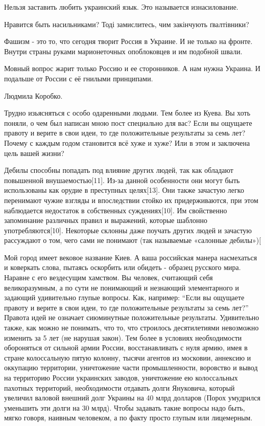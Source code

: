 \begin{itemize}
\begin{itemize}
Нельзя заставить любить украинский язык. Это называется изнасилование.

Нравится быть насильниками? Тоді замислитесь, чим закінчують ґвалтівники?



Фашизм - это то, что сегодня творит Россия в Украине. И не только на фронте.
Внутри страны руками марионеточных опоблоковцев и им подобной швали.

Мовный вопрос жарит только Россию и ее сторонников. А нам нужна Украина. И
подальше от России с её гнилыми принципами.

Людмила Коробко.

Трудно изьясняться с особо одаренными людьми. Тем более из Куева. Вы хоть
поняли, о чем был написан мною пост специально для вас? Если вы ощущаете
правоту и верите в свои идеи, то где положительные результаты за семь лет?
Почему с каждым годом становится всё хуже и хуже? Или в этом и заключена цель
вашей жизни?

Дебилы способны попадать под влияние других людей, так как обладают повышенной
внушаемостью[11]. Из-за данной особенности они могут быть использованы как
орудие в преступных целях[13]. Они также зачастую легко перенимают чужие
взгляды и впоследствии стойко их придерживаются, при этом наблюдается
недостаток в собственных суждениях[10]. Им свойственно запоминание различных
правил и выражений, которые шаблонно употребляются[10]. Некоторые склонны даже
поучать других людей и зачастую рассуждают о том, чего сами не понимают (так
называемые «салонные дебилы»)[


Мой город имеет вековое название Киев. А ваша российская манера насмехаться и
коверкать слова, пытаясь оскорбить или обидеть - образец русского мира. Наравне
с его вездесущим хамством. Вы человек, считающий себя великоразумным, а по сути
не понимающий и незнающий элементарного и задающий удивительно глупые вопросы.
Как, например: \enquote{Если вы ощущаете правоту и верите в свои идеи, то где
положительные результаты за семь лет?} Правота идей не означает сиюминутные
положительные результаты. Удивительно также, как можно не понимать, что то, что
строилось десятилетиями невозможно изменить за 5 лет (не нарушая закон). Тем
более в условиях необходимости обороняться от сильной армии России,
восстанавливать с нуля армию, имея в стране колоссальную пятую колонну, тысячи
агентов из московии, аннексию и оккупацию территории, уничтожение части
промышленности, воровство и вывод на территорию России украинских заводов,
уничтожение ею колоссальных пахотных территорий, необходимости отдавать долги
Януковича, который увеличил валовой внешний долг Украины на 40 млрд долларов
(Порох умудрился уменьшить эти долги на 30 млрд). Чтобы задавать такие вопросы
надо быть, мягко говоря, наивным человеком, а по факту просто глупым или
лицемерным.


\end{itemize}
\end{itemize}
